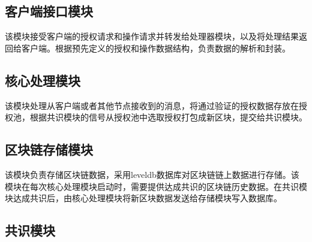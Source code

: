 \subsection{客户端接口模块}

该模块接受客户端的授权请求和操作请求并转发给处理器模块，以及将处理结果返回给客户端。根据预先定义的授权和操作数据结构，负责数据的解析和封装。

\subsection{核心处理模块}

该模块处理从客户端或者其他节点接收到的消息，将通过验证的授权数据存放在授权池，根据共识模块的信号从授权池中选取授权打包成新区块，提交给共识模块。

\subsection{区块链存储模块}

该模块负责存储区块链数据，采用leveldb数据库对区块链链上数据进行存储。该模块在每次核心处理模块启动时，需要提供达成共识的区块链历史数据。在共识模块达成共识后，由核心处理模块将新区块数据发送给存储模块写入数据库。

\subsection{共识模块}

